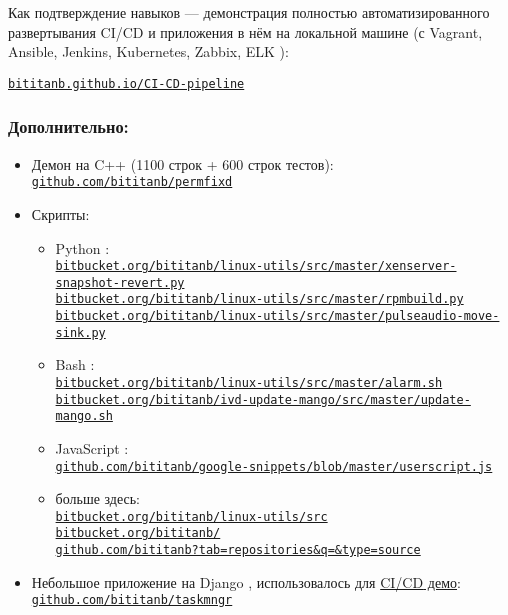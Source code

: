 \documentclass[11pt, a4paper]{article}
\newcommand\rurl[1]{%
  \href{http://#1}{\nolinkurl{#1}}%
}
\newcommand\Eng[1]{%
  \foreignlanguage{english}{#1}%
}
\begin{document}
Как подтверждение навыков — демонстрация полностью автоматизированного развертывания \Eng{CI/CD} и приложения в нём на локальной машине (с \Eng{Vagrant, Ansible, Jenkins, Kubernetes, Zabbix, ELK}):

\rurl{bititanb.github.io/CI-CD-pipeline}

\subsubsection*{Дополнительно:}
\begin{itemize}
  \item Демон на \Eng{C++} (1100 строк + 600 строк тестов):\\
    \rurl{github.com/bititanb/permfixd}
  \item Скрипты:
    \begin{itemize}
      \item \Eng{Python}:\\
        \rurl{bitbucket.org/bititanb/linux-utils/src/master/xenserver-snapshot-revert.py}\\
        \rurl{bitbucket.org/bititanb/linux-utils/src/master/rpmbuild.py}\\
        \rurl{bitbucket.org/bititanb/linux-utils/src/master/pulseaudio-move-sink.py}
      \item \Eng{Bash}:\\
        \rurl{bitbucket.org/bititanb/linux-utils/src/master/alarm.sh}\\
        \rurl{bitbucket.org/bititanb/ivd-update-mango/src/master/update-mango.sh}
      \item \Eng{JavaScript}:\\
        \rurl{github.com/bititanb/google-snippets/blob/master/userscript.js}
      \item больше здесь:\\
        \rurl{bitbucket.org/bititanb/linux-utils/src}\\
        \rurl{bitbucket.org/bititanb/}\\
        \rurl{github.com/bititanb?tab=repositories&q=&type=source}
    \end{itemize}
  \item Небольшое приложение на \Eng{Django}, использовалось для \href{https://github.com/bititanb/CI-CD-pipeline}{\Eng{CI/CD} демо}:\\
    \rurl{github.com/bititanb/taskmngr}
\end{itemize}
\end{document}
